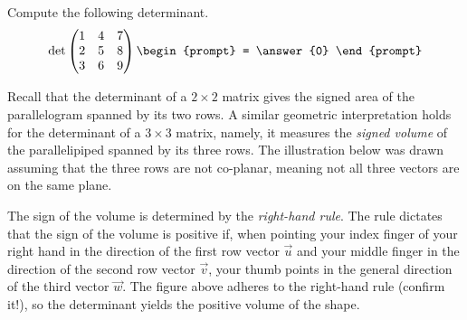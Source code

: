 \documentclass{ximera}
\begin{document}
\begin{question}
  Compute the following determinant.
  \[
    \det
    \begin{pmatrix}
      1 & 4 & 7\\
      2 & 5 & 8\\
      3 & 6 & 9\\
    \end{pmatrix}
    \begin{prompt}
      = \answer{0}
    \end{prompt}
  \]
\end{question}

Recall that the determinant of a $2 \times 2$ matrix gives the signed area
of the parallelogram spanned by its two rows. A similar geometric
interpretation holds for the determinant of a $3 \times 3$ matrix, namely,
it measures the \textit{signed volume} of the parallelipiped spanned
by its three rows. The illustration below was drawn assuming that the
three rows are not co-planar, meaning not all three vectors are on the
same plane.

\begin{image}[.75\textwidth]
\end{image}

The sign of the volume is determined by the \textit{right-hand
  rule}. The rule dictates that the sign of the volume is positive if,
when pointing your index finger of your right hand in the direction of
the first row vector $\vec{u}$ and your middle finger in the direction
of the second row vector $\vec{v}$, your thumb points in the general
direction of the third vector $\vec{w}$. The figure above adheres to
the right-hand rule (confirm it!), so the determinant yields the
positive volume of the shape.
\end{document}

